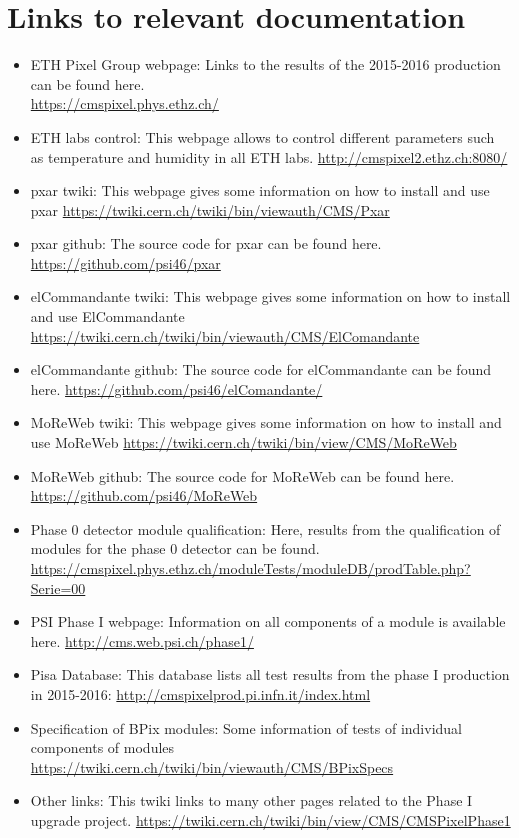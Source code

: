\documentclass[a4paper,12pt,twoside]{article}
\begin{document}
\section{Links to relevant documentation}  \label{Links}
\begin{itemize}
\item ETH Pixel Group webpage: Links to the results of the 2015-2016 production can be found here. \\
\url{https://cmspixel.phys.ethz.ch/}
\item ETH labs control: This webpage allows to control different parameters such as temperature and humidity in all ETH labs.
\url{http://cmspixel2.ethz.ch:8080/}
\item pxar twiki: This webpage gives some information on how to install and use pxar
\url{https://twiki.cern.ch/twiki/bin/viewauth/CMS/Pxar}
\item pxar github: The source code for pxar can be found here.
\url{https://github.com/psi46/pxar}
\item elCommandante twiki: This webpage gives some information on how to install and use ElCommandante
\url{https://twiki.cern.ch/twiki/bin/viewauth/CMS/ElComandante}
\item elCommandante github: The source code for elCommandante can be found here.
\url{https://github.com/psi46/elComandante/}
\item MoReWeb twiki: This webpage gives some information on how to install and use MoReWeb
\url{https://twiki.cern.ch/twiki/bin/view/CMS/MoReWeb}
\item MoReWeb github: The source code for MoReWeb can be found here.
\url{https://github.com/psi46/MoReWeb}
\item Phase 0 detector module qualification: Here, results from the qualification of modules for the phase 0 detector can be found.
\url{https://cmspixel.phys.ethz.ch/moduleTests/moduleDB/prodTable.php?Serie=00}
\item PSI Phase I webpage: Information on all components of a module is available here.
\url{http://cms.web.psi.ch/phase1/}
\item Pisa Database: This database lists all test results from the phase I production in 2015-2016:
\url{http://cmspixelprod.pi.infn.it/index.html}
\item Specification of BPix modules: Some information of tests of individual components of modules 
\url{https://twiki.cern.ch/twiki/bin/viewauth/CMS/BPixSpecs}
\item Other links: This twiki links to many other pages related to the Phase I upgrade project.
\url{https://twiki.cern.ch/twiki/bin/view/CMS/CMSPixelPhase1}

\end{itemize}
\end{document}
